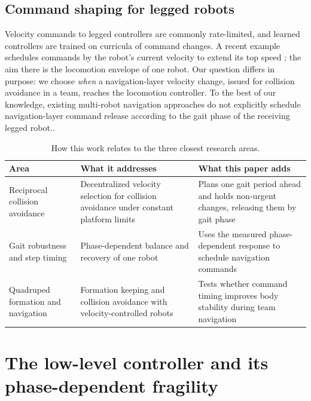 \documentclass[pdflatex,sn-mathphys-num]{sn-jnl}
\begin{document}
\subsection{Command shaping for legged robots}
Velocity commands to legged controllers are commonly rate-limited, and learned controllers are trained on
curricula of command changes. A recent example schedules commands by the robot's current velocity to
extend its top speed \cite{tao2026speed}; the aim there is the locomotion envelope of one robot. Our
question differs in purpose: we choose \emph{when} a navigation-layer velocity change, issued for
collision avoidance in a team, reaches the locomotion controller. To the best of our knowledge, existing multi-robot navigation approaches do not explicitly schedule navigation-layer command release according to the gait phase of the receiving legged robot..

\begin{table}[t]
  \centering
  \caption{How this work relates to the three closest research areas.}
  \label{tab:related}
  \small
  \begin{tabular}{@{}p{30mm} p{40mm} p{42mm}@{}}
    \toprule
    Area & What it addresses & What this paper adds \\
    \midrule
    Reciprocal collision avoidance \cite{vandenberg2011orca,vandenberg2011avo,alonsomora2013nhorca}
      & Decentralized velocity selection for collision avoidance under constant platform limits
      & Plans one gait period ahead and holds non-urgent changes, releasing them by gait phase \\
    Gait robustness and step timing \cite{pratt2006capture,khadiv2016step,chen2022capturability}
      & Phase-dependent balance and recovery of one robot
      & Uses the measured phase-dependent response to schedule navigation commands \\
    Quadruped formation and navigation \cite{zhan2025safe,noren2026role}
      & Formation keeping and collision avoidance with velocity-controlled robots
      & Tests whether command timing improves body stability during team navigation \\
    \bottomrule
  \end{tabular}
\end{table}

\section{The low-level controller and its phase-dependent fragility}\label{sec:controller}
\end{document}
